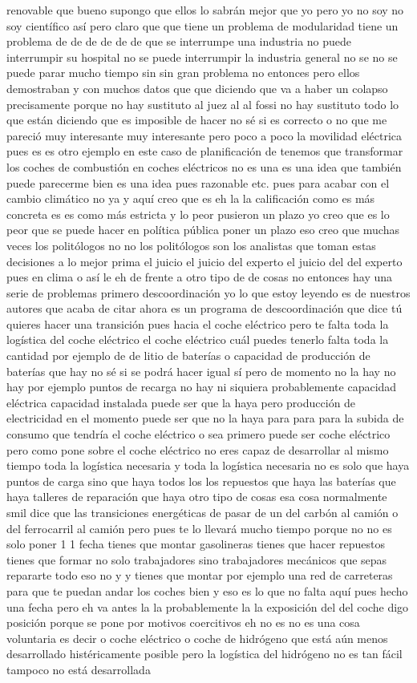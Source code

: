 renovable que bueno supongo que ellos lo sabrán mejor que yo pero yo no soy no soy científico así pero claro que que tiene un problema de modularidad tiene un problema de de de de de de que se interrumpe una industria no puede interrumpir su hospital no se puede interrumpir la industria general no se no se puede parar mucho tiempo sin sin gran problema no entonces pero ellos demostraban y con muchos datos que que diciendo que va a haber un colapso precisamente porque no hay sustituto al juez al al fossi no hay sustituto todo lo que están diciendo que es imposible de hacer no sé si es correcto o no que me pareció muy interesante muy interesante pero poco a poco la movilidad eléctrica pues es es otro ejemplo en este caso de planificación de tenemos que transformar los coches de combustión en coches eléctricos no es una es una idea que también puede parecerme bien es una idea pues razonable etc. pues para acabar con el cambio climático no ya y aquí creo que es eh la la calificación como es más concreta es es como más estricta y lo peor pusieron un plazo yo creo que es lo peor que se puede hacer en política pública poner un plazo eso creo que muchas veces los politólogos no no los politólogos son los analistas que toman estas decisiones a lo mejor prima el juicio el juicio del experto el juicio del del experto pues en clima o así le eh de frente a otro tipo de de cosas no entonces hay una serie de problemas primero descoordinación yo lo que estoy leyendo es de nuestros autores que acaba de citar ahora es un programa de descoordinación que dice tú quieres hacer una transición pues hacia el coche eléctrico pero te falta toda la logística del coche eléctrico el coche eléctrico cuál puedes tenerlo falta toda la cantidad por ejemplo de de litio de baterías o capacidad de producción de baterías que hay no sé si se podrá hacer igual sí pero de momento no la hay no hay por ejemplo puntos de recarga no hay ni siquiera probablemente capacidad eléctrica capacidad instalada puede ser que la haya pero producción de electricidad en el momento puede ser que no la haya para para para la subida de consumo que tendría el coche eléctrico o sea primero puede ser coche eléctrico pero como pone sobre el coche eléctrico no eres capaz de desarrollar al mismo tiempo toda la logística necesaria y toda la logística necesaria no es solo que haya puntos de carga sino que haya todos los los repuestos que haya las baterías que haya talleres de reparación que haya otro tipo de cosas esa cosa normalmente smil dice que las transiciones energéticas de pasar de un del carbón al camión o del ferrocarril al camión pero pues te lo llevará mucho tiempo porque no no es solo poner 1 1 fecha tienes que montar gasolineras tienes que hacer repuestos tienes que formar no solo trabajadores sino trabajadores mecánicos que sepas repararte todo eso no y y tienes que montar por ejemplo una red de carreteras para que te puedan andar los coches bien y eso es lo que no falta aquí pues hecho una fecha pero eh va antes la la probablemente la la exposición del del coche digo posición porque se pone por motivos coercitivos eh no es no es una cosa voluntaria es decir o coche eléctrico o coche de hidrógeno que está aún menos desarrollado histéricamente posible pero la logística del hidrógeno no es tan fácil tampoco no está desarrollada 